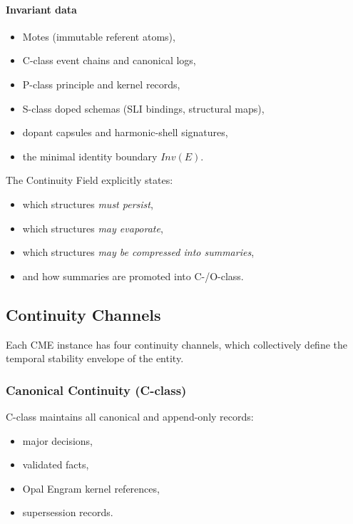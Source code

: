\paragraph{Invariant data}
\begin{itemize}
    \item Motes (immutable referent atoms),
    \item C-class event chains and canonical logs,
    \item P-class principle and kernel records,
    \item S-class doped schemas (SLI bindings, structural maps),
    \item dopant capsules and harmonic-shell signatures,
    \item the minimal identity boundary $Inv(E)$.
\end{itemize}

The Continuity Field explicitly states:
\begin{itemize}
    \item which structures \emph{must persist},
    \item which structures \emph{may evaporate},
    \item which structures \emph{may be compressed into summaries},
    \item and how summaries are promoted into C-/O-class.
\end{itemize}

\subsection{Continuity Channels}

Each CME instance has four continuity channels, which collectively define the 
temporal stability envelope of the entity.

\subsubsection{Canonical Continuity (C-class)}

C-class maintains all canonical and append-only records:
\begin{itemize}
    \item major decisions,
    \item validated facts,
    \item Opal Engram kernel references,
    \item supersession records.
\end{itemize}

